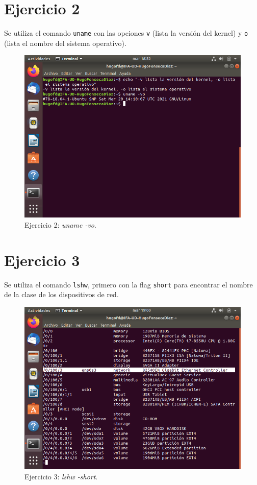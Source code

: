 \documentclass[11pt]{article}
\begin{document}
\section{Ejercicio 2}
Se utiliza el comando \verb|uname| con las opciones \verb|v| (lista la versión del kernel) y \verb|o| (lista el nombre del sistema operativo).
\begin{figure}[h!]
    \caption{Ejercicio 2: \textit{uname -vo}.}
  \centering
  \includegraphics{e2.png}
\end{figure}
\section{Ejercicio 3}
Se utiliza el comando \verb|lshw|, primero con la flag \verb|short| para encontrar el nombre de la clase de los dispositivos de red.
\begin{figure}[h!]
    \caption{Ejercicio 3: \textit{lshw -short}.}
  \centering
  \includegraphics{e3-1.png}
\end{figure}
\end{document}
